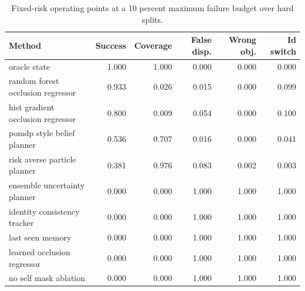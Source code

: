 \begin{table}[t]
\centering
\caption{Fixed-risk operating points at a 10 percent maximum failure budget over hard splits.}
\label{tab:fixed-risk}
\small
\begin{tabular}{lrrrrr}
\toprule
Method & Success & Coverage & False disp. & Wrong obj. & Id switch \\
\midrule
oracle state & 1.000 & 1.000 & 0.000 & 0.000 & 0.000 \\
random forest occlusion regressor & 0.933 & 0.026 & 0.015 & 0.000 & 0.099 \\
hist gradient occlusion regressor & 0.800 & 0.009 & 0.054 & 0.000 & 0.100 \\
pomdp style belief planner & 0.536 & 0.707 & 0.016 & 0.000 & 0.041 \\
risk averse particle planner & 0.381 & 0.976 & 0.083 & 0.002 & 0.003 \\
ensemble uncertainty planner & 0.000 & 0.000 & 1.000 & 1.000 & 1.000 \\
identity consistency tracker & 0.000 & 0.000 & 1.000 & 1.000 & 1.000 \\
last seen memory & 0.000 & 0.000 & 1.000 & 1.000 & 1.000 \\
learned occlusion regressor & 0.000 & 0.000 & 1.000 & 1.000 & 1.000 \\
no self mask ablation & 0.000 & 0.000 & 1.000 & 1.000 & 1.000 \\
\bottomrule
\end{tabular}
\end{table}
